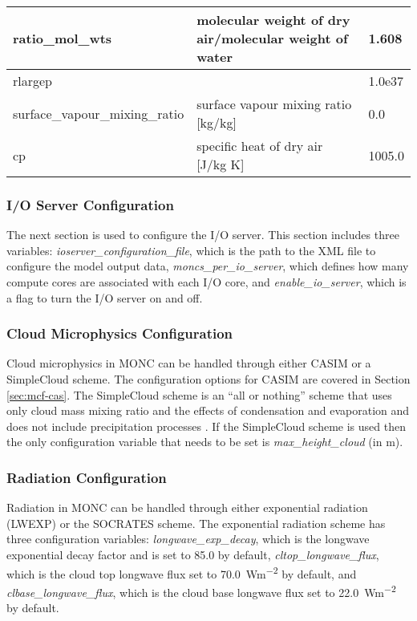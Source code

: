 \begin{table}[h]
{\begin{tabular}{|l|l|l|}
			ratio\_mol\_wts                & molecular weight of dry air/molecular weight of water & 1.608                  \\ \hline
			rlargep                        &                                                       & 1.0e37                 \\ \hline
			surface\_vapour\_mixing\_ratio & surface vapour mixing ratio [kg/kg]                   & 0.0                    \\ \hline
			cp                             & specific heat of dry air [J/kg K]                     & 1005.0                 \\ \hline
		\end{tabular}%
	}
\end{table}

\subsubsection{I/O Server Configuration}
The next section is used to configure the I/O server. This section includes three variables: \textit{ioserver\_configuration\_file}, which is the path to the XML file to configure the model output data, \textit{moncs\_per\_io\_server}, which defines how many compute cores are associated with each I/O core, and \textit{enable\_io\_server}, which is a flag to turn the I/O server on and off. \citep{moncCode}

\subsubsection{Cloud Microphysics Configuration}
Cloud microphysics in MONC can be handled through either CASIM or a SimpleCloud scheme. The configuration options for CASIM are covered in Section \ref{sec:mcf-cas}. The SimpleCloud scheme is an ``all or nothing'' scheme that uses only cloud mass mixing ratio and the effects of condensation and evaporation and does not include precipitation
processes \citep{dear2018}. If the SimpleCloud scheme is used then the only configuration variable that needs to be set is \textit{max\_height\_cloud} (in m). \citep{moncCode}

\subsubsection{Radiation Configuration}
Radiation in MONC can be handled through either exponential radiation (LWEXP) or the SOCRATES scheme. The exponential radiation scheme has three configuration variables: \textit{longwave\_exp\_decay}, which is the longwave exponential decay factor and is set to 85.0 by default, \textit{cltop\_longwave\_flux}, which is the cloud top longwave flux set to \SI{70.0}{Wm^{-2}} by default, and \textit{clbase\_longwave\_flux}, which is the cloud base longwave flux set to \SI{22.0}{Wm^{-2}} by default. \citep{moncCode}

